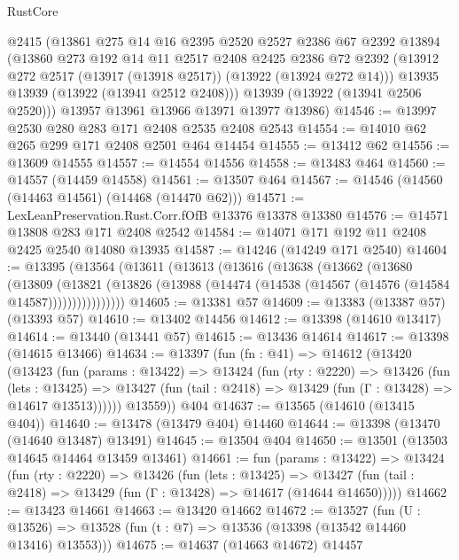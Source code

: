 \begin{lexlean}{RustCore}
\begin{coremodule}
      @2415
      (@13861
        @275
        @14
        @16
        @2395
        @2520
        @2527
        @2386
        @67
        @2392
        @13894
        (@13860
          @273
          @192
          @14
          @11
          @2517
          @2408
          @2425
          @2386
          @72
          @2392
          (@13912 @272 @2517 (@13917 (@13918 @2517)) (@13922 (@13924 @272 @14)))
          @13935
          @13939
          (@13922 (@13941 @2512 @2408)))
        @13939
        (@13922 (@13941 @2506 @2520)))
      @13957
      @13961
      @13966
      @13971
      @13977
      @13986)
@14546 := @13997 @2530 @280 @283 @171 @2408 @2535 @2408 @2543
@14554 := @14010 @62 @265 @299 @171 @2408 @2501 @464 @14454
@14555 := @13412 @62
@14556 := @13609 @14555
@14557 := @14554 @14556
@14558 := @13483 @464
@14560 := @14557 (@14459 @14558)
@14561 := @13507 @464
@14567 := @14546 (@14560 (@14463 @14561) (@14468 (@14470 @62)))
@14571 := LexLeanPreservation.Rust.Corr.fOfB @13376 @13378 @13380
@14576 := @14571 @13808 @283 @171 @2408 @2542
@14584 := @14071 @171 @192 @11 @2408 @2425 @2540 @14080 @13935
@14587 := @14246 (@14249 @171 @2540)
@14604 := @13395
    (@13564
      (@13611
        (@13613
          (@13616
            (@13638
              (@13662
                (@13680
                  (@13809
                    (@13821
                      (@13826 (@13988 (@14474 (@14538 (@14567 (@14576 (@14584 @14587))))))))))))))))
@14605 := @13381 @57
@14609 := @13383 (@13387 @57) (@13393 @57)
@14610 := @13402 @14456
@14612 := @13398 (@14610 @13417)
@14614 := @13440 (@13441 @57)
@14615 := @13436 @14614
@14617 := @13398 (@14615 @13466)
@14634 := @13397
    (fun (fn : @41) =>
    @14612
      (@13420
        (@13423
          (fun (params : @13422) =>
          @13424
            (fun (rty : @2220) =>
            @13426
              (fun (lets : @13425) =>
              @13427 (fun (tail : @2418) => @13429 (fun (Γ : @13428) => @14617 @13513))))))
        @13559))
    @404
@14637 := @13565 (@14610 (@13415 @404))
@14640 := @13478 (@13479 @404) @14460
@14644 := @13398 (@13470 (@14640 @13487) @13491)
@14645 := @13504 @404
@14650 := @13501 (@13503 @14645 @14464 @13459 @13461)
@14661 := fun (params : @13422) =>
  @13424
    (fun (rty : @2220) =>
    @13426
      (fun (lets : @13425) =>
      @13427 (fun (tail : @2418) => @13429 (fun (Γ : @13428) => @14617 (@14644 @14650)))))
@14662 := @13423 @14661
@14663 := @13420 @14662
@14672 := @13527
    (fun (U : @13526) => @13528 (fun (t : @7) => @13536 (@13398 (@13542 @14460 @13416) @13553)))
@14675 := @14637 (@14663 @14672) @14457

\end{coremodule}
\end{lexlean}
